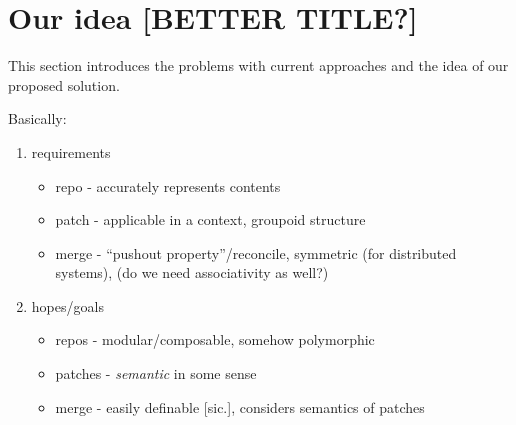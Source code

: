 \section{Our idea [BETTER TITLE?]}

This section introduces the problems with current approaches and the idea of our
proposed solution.

Basically:
\begin{enumerate}
\item requirements
  \begin{itemize}
  \item repo - accurately represents contents
  \item patch - applicable in a context, groupoid structure
  \item merge - ``pushout property''/reconcile, symmetric (for distributed
    systems), (do we need associativity as well?)
  \end{itemize}
\item hopes/goals
  \begin{itemize}
  \item repos - modular/composable, somehow polymorphic
  \item patches - \emph{semantic} in some sense
  \item merge - easily definable [sic.], considers semantics of patches
  \end{itemize}
\end{enumerate}